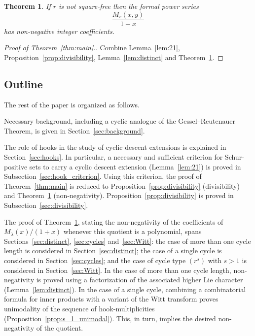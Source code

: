 \documentclass[10pt]{article}
\newtheorem{theorem}{Theorem}[section]
\theoremstyle{definition}
\begin{document}
\begin{theorem}\label{t:main_hook-alternating2}
    If $r$ is not square-free then the formal power series 
    \[
        \frac{M_r(x,y)}{1+x}
    \] 
	has non-negative integer coefficients.
\end{theorem}

\begin{proof}[Proof of Theorem~\ref{thm:main}.]
    Combine Lemma~\ref{lem:21}, Proposition~\ref{prop:divisibility}, Lemma~\ref{lem:distinct} and Theorem~\ref{t:main_hook-alternating2}. 
\end{proof}
    

\subsection{Outline}

The rest of the paper is organized as follows. 

Necessary background, including a cyclic analogue of the Gessel--Reutenauer Theorem, is given in Section~\ref{sec:background}.

The role of hooks in the study of cyclic descent extensions is explained in Section~\ref{sec:hooks}.
In particular, a necessary and sufficient criterion
for Schur-positive sets to carry a cyclic descent extension (Lemma~\ref{lem:21}) is proved in Subsection~\ref{sec:hook_criterion}.
Using this criterion, the proof of Theorem~\ref{thm:main} is reduced
to Proposition~\ref{prop:divisibility} (divisibility) and  Theorem~\ref{t:main_hook-alternating2} (non-negativity).
Proposition~\ref{prop:divisibility} is proved in Subsection~\ref{sec:divisibility}.  

The proof of Theorem~\ref{t:main_hook-alternating2}, stating the non-negativity of the coefficients of~$M_\lambda(x)/(1+x)$ whenever this quotient is a polynomial, spans 
Sections~\ref{sec:distinct}, \ref{sec:cycles} and~\ref{sec:Witt}:
the case of more than one cycle length is considered in Section~\ref{sec:distinct};
the case of a single cycle 
is considered in Section~\ref{sec:cycles};
and the case of cycle type $(r^s)$ with $s>1$ is considered in Section~\ref{sec:Witt}.
In the case of more than one cycle length, 
non-negativity is proved using a factorization of the associated higher Lie character (Lemma~\ref{lem:distinct}).  
In the case of a single cycle,  
combining a combinatorial formula for inner products with a variant of the Witt transform 
proves unimodality of the sequence of hook-multiplicities (Proposition~\ref{prop:s=1_unimodal}). This, in turn, implies the desired non-negativity of the quotient.  
\end{document}

